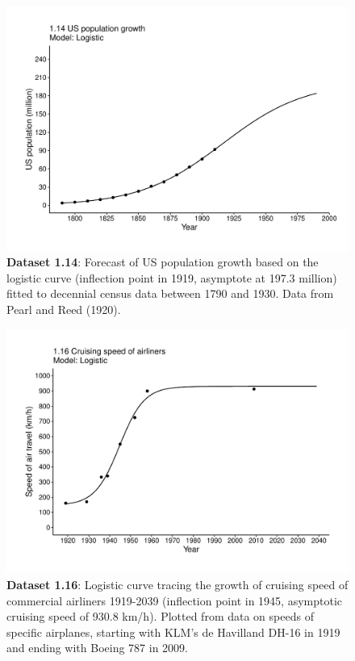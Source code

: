 \documentclass[aps,rmp,preprint,superscriptaddress,10pt,onecolumn]{article}
\begin{document}
\clearpage
\begin{figure}[h]
\includegraphics[width=\textwidth]{output/figs-ggplot/1.14.pdf}
\caption{\textbf{Dataset 1.14}: Forecast of US population growth based on the logistic curve (inflection point in 1919, asymptote at 197.3 million) fitted to decennial census data between 1790 and 1930. Data from Pearl and Reed (1920).}
\end{figure}
	
\clearpage
\begin{figure}[h]
\includegraphics[width=\textwidth]{output/figs-ggplot/1.16.pdf}
\caption{\textbf{Dataset 1.16}: Logistic curve tracing the growth of cruising speed of commercial airliners 1919-2039 (inflection point in 1945, asymptotic cruising speed of 930.8 km/h). Plotted from data on speeds of specific airplanes, starting with KLM's de Havilland DH-16 in 1919 and ending with Boeing 787 in 2009. }
\end{figure}
	
\end{document}
